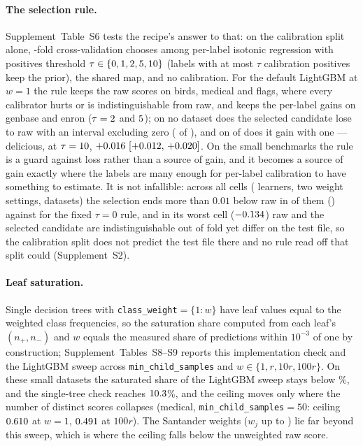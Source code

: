 \documentclass[sigconf,nonacm]{acmart}
\newcommand{\Supp}[1]{Supplement~#1}  %
\begin{document}
\paragraph{The selection rule.} \Supp{Table~S6} tests the recipe's answer to that: on the calibration split alone, \ntauFolds-fold cross-validation chooses among per-label isotonic regression with positives threshold $\tau\in\{0, 1, 2, 5, 10\}$ (labels with at most $\tau$ calibration positives keep the prior), the shared map, and no calibration. For the default LightGBM at $w{=}1$ the rule keeps the raw scores on birds, medical and flags, where every calibrator hurts or is indistinguishable from raw, and keeps the per-label gains on genbase and enron ($\tau=2$ and $5$); on no dataset does the selected candidate lose to raw with an interval excluding zero (\nnHurtAfterTau{} of \nnMulan), and on \nnTauSigGain{} of \nnMulan{} does it gain with one --- delicious, at $\tau=10$, $+0.016~[+0.012,\,+0.020]$. On the small benchmarks the rule is a guard against loss rather than a source of gain, and it becomes a source of gain exactly where the labels are many enough for per-label calibration to have something to estimate. It is not infallible: across all \nnTauCells{} cells (\nnLearners{} learners, two weight settings, \nnMulan{} datasets) the selection ends more than $0.01$ below raw in \nnTauSelBelowRaw{} of them (\ntauFailCells) against \nnTauZeroBelowRaw{} for the fixed $\tau=0$ rule, and in its worst cell ($-0.134$) raw and the selected candidate are indistinguishable out of fold yet differ on the test file, so the calibration split does not predict the test file there and no rule read off that split could (\Supp{S2}).

\paragraph{Leaf saturation.} Single decision trees with \texttt{class\_weight}$=\{1{:}w\}$ have leaf values equal to the weighted class frequencies, so the saturation share computed from each leaf's $(n_+,n_-)$ and $w$ equals the measured share of predictions within $10^{-3}$ of one by construction; \Supp{Tables~S8--S9} reports this implementation check and the LightGBM sweep across \texttt{min\_child\_samples} and $w\in\{1,r,10r,100r\}$. On these small datasets the saturated share of the LightGBM sweep stays below \nleafLgbmMaxSat\%, and the single-tree check reaches $10.3$\%, and the ceiling moves only where the number of distinct scores collapses (medical, \texttt{min\_child\_samples}$=50$: ceiling $0.610$ at $w{=}1$, $0.491$ at $100r$). The Santander weights ($w_j$ up to \nwMax) lie far beyond this sweep, which is where the ceiling falls below the unweighted raw score.
\end{document}
